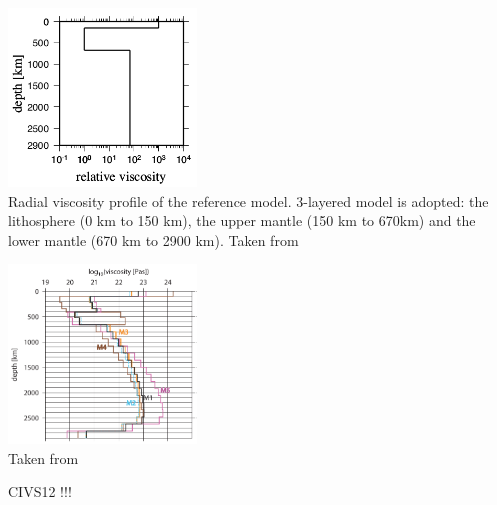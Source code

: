 

\begin{center}
\includegraphics[width=5cm]{images/viscosity_profile/yohk01}\\
{\captionfont Radial viscosity profile of the reference model. 3-layered model is adopted: 
the lithosphere (0 km to 150 km), the upper mantle (150 km to 670km) 
and the lower mantle (670 km to 2900 km). Taken from \cite{yohk01}}
\end{center}

\begin{center}
\includegraphics[width=5cm]{images/viscosity_profile/stca06}\\
{\captionfont Taken from \cite{stca06}}
\end{center}


CIVS12 !!!
